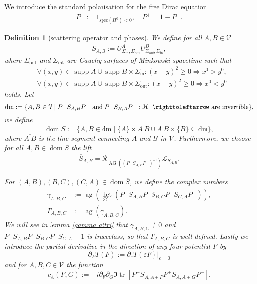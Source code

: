\documentclass[b5paper,draft,openbib,12pt]{memoir}
\newtheorem{Def}{Definition}
\DeclareMathOperator{\tr}{tr}
\DeclareMathOperator{\supp}{supp}
\DeclareMathOperator{\ag}{ag}
\DeclareMathOperator{\AG}{AG}
\DeclareMathOperator{\dom}{dom}
\begin{document}
We introduce the standard polarisation for the free Dirac equation
\begin{align}
P^-:=1_{\mathrm{spec}(H^0)<0}, \quad P^+=1-P^-.
\end{align}



\begin{Def}[scattering operator and phases]\label{def: S bar, gamma, cA}
We define for all \(A,B\in\mathcal{V} \)
\begin{align}
S_{A,B}:=U^{A}_{\Sigma_{\mathrm{in}},\Sigma_{\mathrm{out}}}U^{B}_{\Sigma_{\mathrm{out}},\Sigma_{\mathrm{in}}},
\end{align}
where \(\Sigma_{\mathrm{out}}\) and \(\Sigma_{\mathrm{int}}\)  are Cauchy-surfaces of Minkowski spacetime such that 
\begin{align}
&\forall (x,y)\in \supp A\cup\supp B\times \Sigma_{\mathrm{in}}: (x-y)^2 \ge 0\Rightarrow x^0>y^0,\\
&\forall (x,y)\in \supp A\cup\supp B\times \Sigma_{\mathrm{out}}: (x-y)^2 \ge 0\Rightarrow x^0<y^0
\end{align}
holds.
Let 
\begin{equation}
\mathrm{dm}:=\{A,B\in\mathcal{V}\mid P^- S_{A,B}P^-\text{ and } P^- S_{B,A}P^-:\mathcal{H}^- \righttoleftarrow  \text{ are invertible}\},
\end{equation}
we define
\begin{equation}\label{dom s bar}
\dom\overline{S}:=\{A,B\in \mathrm{dm}\mid \{A\}\times \overline{A~B} \cup \overline{A~B}\times \{B\}\subseteq \mathrm{dm} \},
\end{equation}
where \(\overline{A~B}\) is the line segment connecting \(A\) and \(B\) in \(\mathcal{V}\).
Furthermore, we choose for all \(A,B\in \dom \overline{S}\) the lift
\begin{align}
\overline{S}_{A,B}=\mathcal{R}_{\AG((P^- S_{A,B}P^-)^{-1})} \mathcal{L}_{S_{A,B}}.
\end{align}

For \((A,B),(B,C), (C,A)\in\dom\overline{S}\), we define 
 the complex numbers 
\begin{align}\label{def: gamma}
\gamma_{A,B,C}&:=\ag(\det_{\mathcal{H}^-} (P^- S_{A,B} P^- S_{B,C} P^- S_{C,A}P^-)),\\
\Gamma_{A,B,C}&:=\ag(\gamma_{A,B,C}).
\end{align}
We will see in lemma \ref{gamma attri} that \(\gamma_{A,B,C}\neq 0\) and
\( P^-S_{A,B}P^-S_{B,C}P^-S_{C,A}-1\) is traceclass, so that \(\Gamma_{A,B,C}\) is well-defined.
Lastly we introduce the partial derivative in the direction of any four-potential \(F\) by
\begin{equation}
\partial_F T(F):=\partial_{\varepsilon}T(\varepsilon F)|_{\varepsilon =0}
\end{equation}
and for  \(A,B,C\in\mathcal{V}\) the function
\begin{equation}
c_A(F,G):=-i \partial_F \partial_G  \Im \tr [P^- S_{A,A+F} P^+ S_{A,A+G} P^-] .
\end{equation}
\end{Def}
\end{document}
